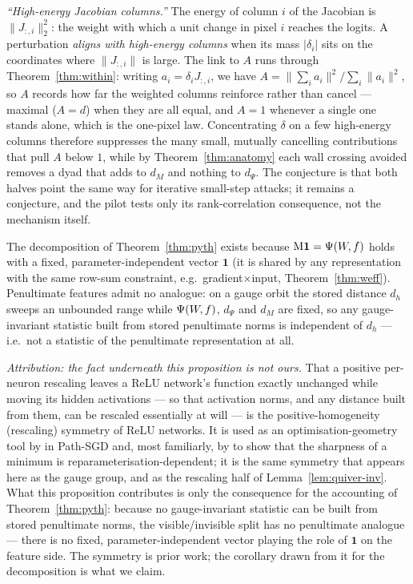 \begin{clarifybox}
\emph{``High-energy Jacobian columns.''} The energy of column $i$ of the
Jacobian is $\|J_{:,i}\|_2^2$: the weight with which a unit change in pixel
$i$ reaches the logits. A perturbation \emph{aligns with high-energy columns}
when its mass $|\delta_i|$ sits on the coordinates where $\|J_{:,i}\|$ is
large. The link to $A$ runs through Theorem~\ref{thm:within}: writing
$a_i=\delta_iJ_{:,i}$, we have $A=\|\sum_ia_i\|^2/\sum_i\|a_i\|^2$, so $A$
records how far the weighted columns reinforce rather than cancel --- maximal
($A=d$) when they are all equal, and $A=1$ whenever a single one stands alone,
which is the one-pixel law. Concentrating $\delta$ on a few high-energy
columns therefore suppresses the many small, mutually cancelling contributions
that pull $A$ below $1$, while by Theorem~\ref{thm:anatomy} each wall crossing
avoided removes a dyad that adds to $d_M$ and nothing to $d_\Psi$. The conjecture
is that both halves point the same way for iterative small-step attacks; it
remains a conjecture, and the pilot tests only its rank-correlation
consequence, not the mechanism itself.
\end{clarifybox}

\begin{proposition}
\label{prop:dichotomy}
The decomposition of Theorem~\ref{thm:pyth} exists because
$\mathrm{M}\mathbf 1=\Psi(W\!,f)$ holds with a fixed, parameter-independent vector $\mathbf 1$
(it is shared by any representation with the same row-sum constraint, e.g.\
gradient$\times$input, Theorem~\ref{thm:weff}). Penultimate
features admit no analogue: on a gauge orbit the stored distance $d_h$ sweeps
an unbounded range while $\Psi(W\!,f)$, $d_\Psi$ and $d_M$ are fixed, so any gauge-invariant
statistic built from stored penultimate norms is independent of $d_h$ ---
i.e.\ not a statistic of the penultimate representation at all.
\end{proposition}

\begin{clarifybox}
\emph{Attribution: the fact underneath this proposition is not ours.} That a
positive per-neuron rescaling leaves a ReLU network's function exactly
unchanged while moving its hidden activations --- so that activation norms,
and any distance built from them, can be rescaled essentially at will --- is
the positive-homogeneity (rescaling) symmetry of ReLU networks. It is used as
an optimisation-geometry tool by \citet{neyshabur2015path} in Path-SGD and,
most familiarly, by \citet{dinh2017sharp} to show that the sharpness of a
minimum is reparameterisation-dependent; it is the same symmetry that appears
here as the gauge group, and as the rescaling half of
Lemma~\ref{lem:quiver-inv}. What this proposition contributes is only the
consequence for the accounting of Theorem~\ref{thm:pyth}: because no
gauge-invariant statistic can be built from stored penultimate norms, the
visible/invisible split has no penultimate analogue --- there is no fixed,
parameter-independent vector playing the role of $\mathbf 1$ on the feature
side. The symmetry is prior work; the corollary drawn from it for the
decomposition is what we claim.
\end{clarifybox}

